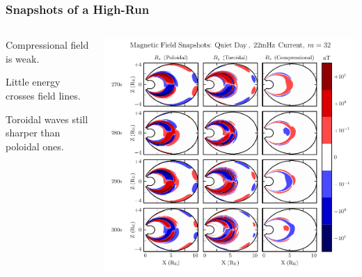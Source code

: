 \documentclass{beamer}
\begin{document}

\begin{frame}
\frametitle{Snapshots of a High-\azm Run}

\begin{columns}
\begin{wideitemize}
\item Compressional field is weak. 
\item Little energy crosses field lines. 
\item Toroidal waves still sharper than poloidal ones. 
\end{wideitemize}
\includegraphics[width=\textwidth]{figures/snapshot_bigm.pdf}
\end{columns}

\end{frame}

\end{document}
